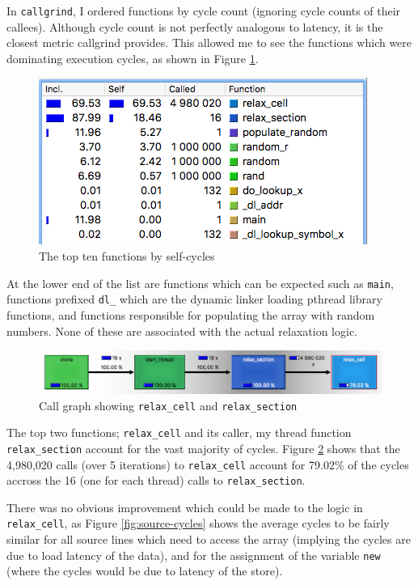 \documentclass[12pt]{article}
\begin{document}
In \texttt{callgrind}, I ordered functions by cycle count (ignoring cycle counts of their callees). Although cycle count is not perfectly analogous to latency, it is the closest metric callgrind provides. This allowed me to see the functions which were dominating execution cycles, as shown in Figure \ref{fig:top-cycles}.
\begin{figure}[!h]
\centering
\includegraphics[width=.5\textwidth]{img/top-ten.png}
\caption{The top ten functions by self-cycles}
\label{fig:top-cycles}
\end{figure}
At the lower end of the list are functions which can be expected such as \texttt{main}, functions prefixed \texttt{dl\_} which are the dynamic linker loading pthread library functions, and functions responsible for populating the array with random numbers. None of these are associated with the actual relaxation logic. 

\begin{figure}[htbp!]
\hspace{-0.7cm}\includegraphics[width=1.1\textwidth]{img/cg.png}
\caption{Call graph showing \texttt{relax\_cell} and \texttt{relax\_section}}
\label{fig:cg}
\end{figure}

The top two functions; \texttt{relax\_cell} and its caller, my thread function \texttt{relax\_section} account for the vast majority of cycles. Figure \ref{fig:cg} shows that the 4,980,020 calls (over 5 iterations) to \texttt{relax\_cell} account for 79.02\% of the cycles accross the 16 (one for each thread) calls to  \texttt{relax\_section}.

There was no obvious improvement which could be made to the logic in \texttt{relax\_cell}, as Figure \ref{fig:source-cycles} shows the average cycles to be fairly similar for all source lines which need to access the array (implying the cycles are due to load latency of the data), and for the assignment of the variable \texttt{new} (where the cycles would be due to latency of the store).
\end{document}

